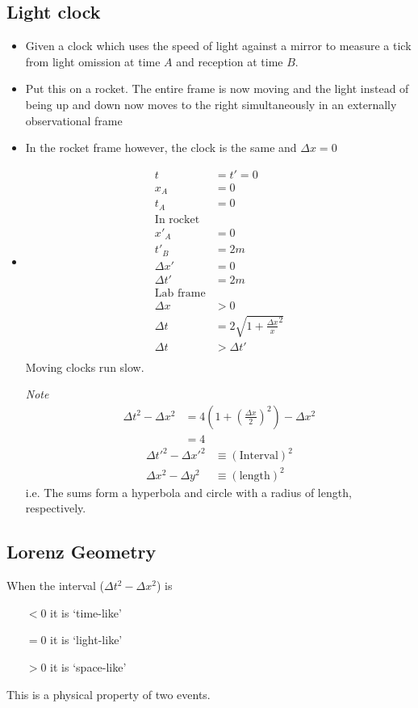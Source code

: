 \documentclass[12pt,letterpaper, twocolumn]{article}
\begin{document}
\subsection{Light clock}
\begin{itemize}
    \item Given a clock which uses the speed of light against a mirror to measure a tick from light omission at time $A$ and reception at time $B$. 
    \item Put this on a rocket. The entire frame is now moving and the light instead of being up and down now moves to the right simultaneously in an externally observational frame
    \item In the rocket frame however, the clock is the same and $\Delta x=0$
    \item \begin{align*}
        t&=t'=0\\
        x_A&=0\\
        t_A&=0\\
        \text{In rocket}\\
        x'_A&=0\\
        t'_B&=2m\\
        \Delta x'&=0\\
        \Delta t'&=2m\\
        \text{Lab frame}\\
        \Delta x &> 0\\
        \Delta t &= 2\sqrt{1+\frac{\Delta x}{x}^2}\\
        \Delta t &> \Delta t'\\ 
    \end{align*}
    Moving clocks run slow. 

    \textit{Note} \begin{align*}
        \Delta t^2-\Delta x^2 &= 4(1+(\frac{\Delta x}{2})^2)-\Delta x^2\\
        &= 4
    \end{align*}
    \begin{align*}
        \Delta t'^2-\Delta x'^2&\equiv (\text{Interval})^2\\
        \Delta x^2-\Delta y^2&\equiv (\text{length})^2
    \end{align*}
    i.e. The sums form a hyperbola and  circle with a radius of length, respectively. 
\end{itemize}

\vfill\null
\subsection*{Lorenz Geometry}
When the interval ($\Delta t^2 - \Delta x^2$) is 
\begin{itemize}
    \item[$< 0$] it is `time-like'
    \item[$= 0$] it is `light-like'
    \item[$> 0$] it is `space-like'
\end{itemize}
This is a physical property of two events.
\end{document}
